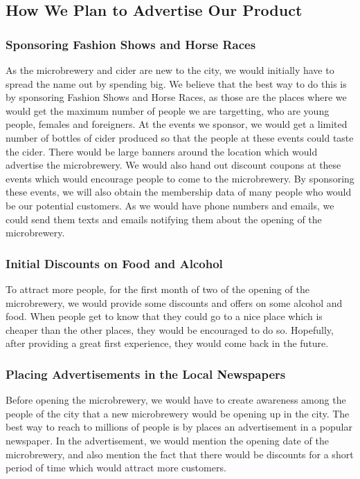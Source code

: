 \documentclass{article}
\begin{document}
\subsection{How We Plan to Advertise Our Product}
\subsubsection{Sponsoring Fashion Shows and Horse Races}
As the microbrewery and cider are new to the city, we would initially have to
spread the name out by spending big. We believe that the best way to do this is
by sponsoring Fashion Shows and Horse Races, as those are the places where we would
get the maximum number of people we are targetting, who are young people, females
and foreigners.
At the events we sponsor, we would get a limited number of bottles of cider produced
so that the people at these events could taste the cider. There would be large banners
around the location which would advertise the microbrewery. We would also hand out
discount coupons at these events which would encourage people to come to the
microbrewery.
By sponsoring these events, we will also obtain the membership data of many
people who would be our potential customers. As we would have phone numbers and
emails, we could send them texts and emails notifying them about the opening of
the microbrewery.

\subsubsection{Initial Discounts on Food and Alcohol}
To attract more people, for the first month of two of the opening of the microbrewery,
we would provide some discounts and offers on some alcohol and food. When people
get to know that they could go to a nice place which is cheaper than the other
places, they would be encouraged to do so. Hopefully, after providing a great first
experience, they would come back in the future.

\subsubsection{Placing Advertisements in the Local Newspapers}
Before opening the microbrewery, we would have to create awareness among the
people of the city that a new microbrewery would be opening up in the city. The
best way to reach to millions of people is by places an advertisement in a popular
newspaper. In the advertisement, we would mention the opening date of the
microbrewery, and also mention the fact that there would be discounts for a short
period of time which would attract more customers.
\end{document}

